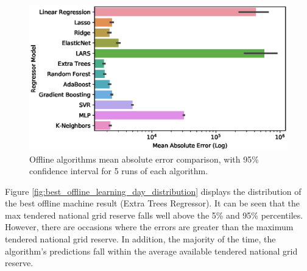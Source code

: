 \documentclass[final,3p,times,twocolumn,numbers]{elsarticle}
\begin{document}
\begin{figure}[h]
\centering
\includegraphics[width=\columnwidth,natwidth=500,natheight=260]{figures/results/offline_model_mae.eps}
\caption{Offline algorithms mean absolute error comparison, with 95\% confidence interval for 5 runs of each algorithm.}
\label{fig:beis_elecsim_historic_comparison}
\end{figure}



Figure \ref{fig:best_offline_learning_day_distribution} displays the distribution of the best offline machine result (Extra Trees Regressor). It can be seen that the max tendered national grid reserve falls well above the 5\% and 95\% percentiles. However, there are occasions where the errors are greater than the maximum tendered national grid reserve. In addition, the majority of the time, the algorithm's predictions fall within the average available tendered national grid reserve.
\end{document}
